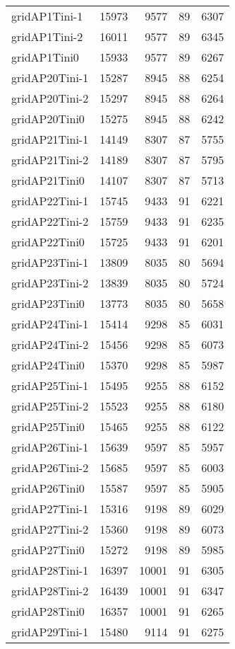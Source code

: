 \begin{longtable}{lrrrr}
gridAP1Tini-1 & 15973 & 9577 & 89 & 6307 \\
gridAP1Tini-2 & 16011 & 9577 & 89 & 6345 \\
gridAP1Tini0 & 15933 & 9577 & 89 & 6267 \\
gridAP20Tini-1 & 15287 & 8945 & 88 & 6254 \\
gridAP20Tini-2 & 15297 & 8945 & 88 & 6264 \\
gridAP20Tini0 & 15275 & 8945 & 88 & 6242 \\
gridAP21Tini-1 & 14149 & 8307 & 87 & 5755 \\
gridAP21Tini-2 & 14189 & 8307 & 87 & 5795 \\
gridAP21Tini0 & 14107 & 8307 & 87 & 5713 \\
gridAP22Tini-1 & 15745 & 9433 & 91 & 6221 \\
gridAP22Tini-2 & 15759 & 9433 & 91 & 6235 \\
gridAP22Tini0 & 15725 & 9433 & 91 & 6201 \\
gridAP23Tini-1 & 13809 & 8035 & 80 & 5694 \\
gridAP23Tini-2 & 13839 & 8035 & 80 & 5724 \\
gridAP23Tini0 & 13773 & 8035 & 80 & 5658 \\
gridAP24Tini-1 & 15414 & 9298 & 85 & 6031 \\
gridAP24Tini-2 & 15456 & 9298 & 85 & 6073 \\
gridAP24Tini0 & 15370 & 9298 & 85 & 5987 \\
gridAP25Tini-1 & 15495 & 9255 & 88 & 6152 \\
gridAP25Tini-2 & 15523 & 9255 & 88 & 6180 \\
gridAP25Tini0 & 15465 & 9255 & 88 & 6122 \\
gridAP26Tini-1 & 15639 & 9597 & 85 & 5957 \\
gridAP26Tini-2 & 15685 & 9597 & 85 & 6003 \\
gridAP26Tini0 & 15587 & 9597 & 85 & 5905 \\
gridAP27Tini-1 & 15316 & 9198 & 89 & 6029 \\
gridAP27Tini-2 & 15360 & 9198 & 89 & 6073 \\
gridAP27Tini0 & 15272 & 9198 & 89 & 5985 \\
gridAP28Tini-1 & 16397 & 10001 & 91 & 6305 \\
gridAP28Tini-2 & 16439 & 10001 & 91 & 6347 \\
gridAP28Tini0 & 16357 & 10001 & 91 & 6265 \\
gridAP29Tini-1 & 15480 & 9114 & 91 & 6275 \\

\end{longtable}
